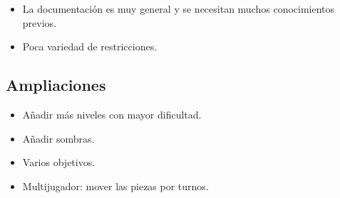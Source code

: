 \documentclass[12pt]{article}
\begin{document}
\begin{itemize}
  \item La documentación es muy general y se necesitan muchos conocimientos previos.
  \item Poca variedad de restricciones.
\end{itemize}

\subsection{Ampliaciones}

\begin{itemize}
  \item Añadir más niveles con mayor dificultad.
  \item Añadir sombras.
  \item Varios objetivos.
  \item Multijugador: mover las piezas por turnos.
\end{itemize}
\end{document}
